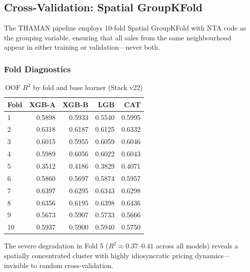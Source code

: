\documentclass[11pt, a4paper, twoside]{article}
\begin{document}
\subsection{Cross-Validation: Spatial GroupKFold}
The THAMAN pipeline employs 10-fold Spatial GroupKFold with NTA code as the
grouping variable, ensuring that all sales from the same neighbourhood appear
in either training or validation---never both.

\subsubsection{Fold Diagnostics}
\begin{table}[H]
  \centering
  \caption{OOF $R^2$ by fold and base learner (Stack v22)}
  \label{tab:fold_diag}
  \begin{tabular}{lrrrr}
    \toprule
    Fold & XGB-A & XGB-B & LGB & CAT \\
    \midrule
     1 & 0.5898 & 0.5933 & 0.5540 & 0.5995 \\
     2 & 0.6318 & 0.6187 & 0.6125 & 0.6332 \\
     3 & 0.6015 & 0.5955 & 0.6059 & 0.6046 \\
     4 & 0.5989 & 0.6056 & 0.6022 & 0.6043 \\
     5 & 0.3512 & 0.4186 & 0.3829 & 0.4071 \\
     6 & 0.5860 & 0.5697 & 0.5874 & 0.5957 \\
     7 & 0.6397 & 0.6295 & 0.6343 & 0.6298 \\
     8 & 0.6356 & 0.6195 & 0.6398 & 0.6436 \\
     9 & 0.5673 & 0.5907 & 0.5733 & 0.5666 \\
    10 & 0.5937 & 0.5900 & 0.5940 & 0.5750 \\
    \bottomrule
  \end{tabular}
\end{table}
The severe degradation in Fold 5 ($R^2 \approx 0.37$--$0.41$ across all models)
reveals a spatially concentrated cluster with highly idiosyncratic pricing
dynamics---invisible to random cross-validation.
\end{document}
